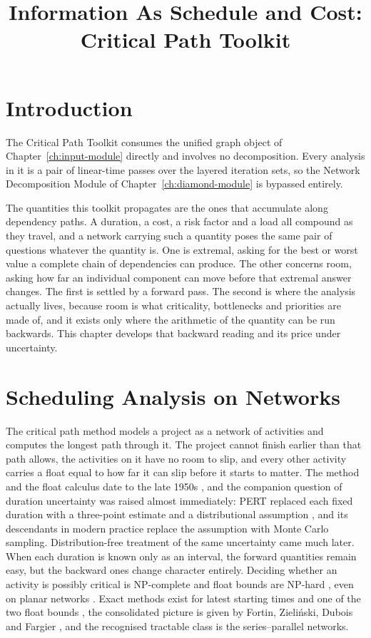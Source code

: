 \documentclass[12pt]{report}
\begin{document}
\title{Information As Schedule and Cost: Critical Path Toolkit}
\fi

\newcommand{\comb}{\oplus}
\newcommand{\prop}{\otimes}

\section{Introduction}
\label{sec:cpm-intro}

The Critical Path Toolkit consumes the unified graph object of
Chapter~\ref{ch:input-module} directly and involves no decomposition. Every
analysis in it is a pair of linear-time passes over the layered iteration
sets, so the Network Decomposition Module of Chapter~\ref{ch:diamond-module}
is bypassed entirely.

The quantities this toolkit propagates are the ones that accumulate along
dependency paths. A duration, a cost, a risk factor and a load all compound
as they travel, and a network carrying such a quantity poses the same pair
of questions whatever the quantity is. One is extremal, asking for the best
or worst value a complete chain of dependencies can produce. The other
concerns room, asking how far an individual component can move before that
extremal answer changes. The first is settled by a forward pass. The second
is where the analysis actually lives, because room is what criticality,
bottlenecks and priorities are made of, and it exists only where the
arithmetic of the quantity can be run backwards. This chapter develops that
backward reading and its price under uncertainty.

\section{Scheduling Analysis on Networks}
\label{sec:cpm-grounding}

The critical path method models a project as a network of activities and
computes the longest path through it. The project cannot finish earlier than
that path allows, the activities on it have no room to slip, and every other
activity carries a float equal to how far it can slip before it starts to
matter. The method and the float calculus date to the late 1950s
\cite{kelley1959critical}, and the companion question of duration uncertainty
was raised almost immediately: PERT replaced each fixed duration with a
three-point estimate and a distributional assumption
\cite{malcolm1959pert}, and its descendants in modern practice replace the
assumption with Monte Carlo sampling. Distribution-free treatment of the same
uncertainty came much later. When each duration is known only as an interval,
the forward quantities remain easy, but the backward ones change character
entirely. Deciding whether an activity is possibly critical is NP-complete
and float bounds are NP-hard \cite{chanas2002complexity}, even on planar
networks \cite{chanas2003planar}. Exact methods exist for latest starting
times and one of the two float bounds \cite{dubois2005floats}, the
consolidated picture is given by Fortin, Zieli\'{n}ski, Dubois and Fargier
\cite{fortin2010criticality}, and the recognised tractable class is the
series--parallel networks.
\end{document}
